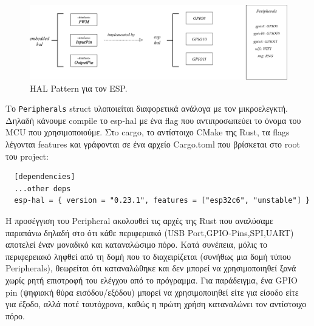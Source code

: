 \begin{figure}[htb!]
  \centering
  \includegraphics[scale=0.4]{images/rust/peripheral_pattern.drawio.png}
  \caption{HAL Pattern για τον ESP.}
  \label{fig:peripheral_pattern}
\end{figure}

Το \verb|Peripherals| struct υλοποιείται διαφορετικά ανάλογα με τον
μικροελεγκτή. Δηλαδή κάνουμε compile το esp-hal με ένα flag που
αντιπροσωπεύει το όνομα του MCU που χρησιμοποιούμε. Στo cargo, το αντίστοιχο
CMake της Rust, τα flags λέγονται features και γράφονται σε ένα αρχείο Cargo.toml
που βρίσκεται στο root του project:

\begin{lstlisting}
  [dependencies]
  ...other deps
  esp-hal = { version = "0.23.1", features = ["esp32c6", "unstable"] }
\end{lstlisting}

Η προσέγγιση του Peripheral ακολουθεί τις αρχές της
Rust που αναλύσαμε παραπάνω δηλαδή στο ότι κάθε περιφεριακό (USB
Port,GPIO-Pins,SPI,UART) αποτελεί έναν μοναδικό και καταναλώσιμο πόρο.
Κατά συνέπεια, μόλις το περιφερειακό ληφθεί από τη δομή που το
διαχειρίζεται (συνήθως μια δομή τύπου Peripherals), θεωρείται ότι
καταναλώθηκε και δεν μπορεί να χρησιμοποιηθεί ξανά χωρίς ρητή
επιστροφή του ελέγχου από το πρόγραμμα. Για παράδειγμα, ένα GPIO pin
(ψηφιακή θύρα εισόδου/εξόδου) μπορεί να χρησιμοποιηθεί είτε για είσοδο
είτε για έξοδο, αλλά ποτέ ταυτόχρονα, καθώς η πρώτη χρήση καταναλώνει
τον αντίστοιχο πόρο.



